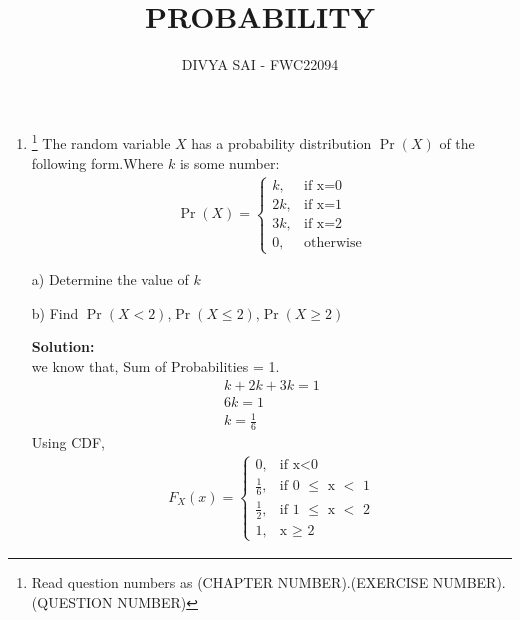 \documentclass{article}
\providecommand{\pr}[1]{\ensuremath{\Pr\left(#1\right)}}
\newcommand{\solution}{\noindent \textbf{Solution: }}
\begin{document}
\title{PROBABILITY}
\author{\Large DIVYA SAI - FWC22094}
\date{}

\maketitle
\begin{enumerate}
[label=16.\arabic{enumi}.\arabic{enumii}]%
\setcounter{enumi}{3}
\setcounter{enumii}{10}

\item \footnote{Read question numbers as (CHAPTER NUMBER).(EXERCISE NUMBER).(QUESTION NUMBER)} {The random variable $X$ has a probability distribution \pr{X} of the following form.Where $k$ is some number: }
\begin{align}
  \pr{X} =
    \begin{cases}
      k,  & \text{if x=0}\\
      2k, & \text{if x=1}\\
      3k, & \text{if x=2}\\
      0 , & \text{otherwise}
    \end{cases}       
\end{align}

a) Determine the value of $k$ 

b) Find \pr{X < 2},\pr{X \leq 2},\pr{X \geq 2}  


\solution\\
we know that,
Sum of Probabilities = 1.
\begin{align}
&k + 2k + 3k  = 1 &\\
&6k = 1 &\\
&k = \frac{1}{6}&
\end{align}
Using CDF,
\begin{align}
  F_X(x) =
    \begin{cases}
      0,  & \text{if x$<$0}\\
      \frac{1}{6}, & \text{if 0 $\leq$ x $<$ 1}\\
      \frac{1}{2}, & \text{if 1 $\leq$ x $<$ 2}\\
      1 , & \text{x $\geq$ 2}
    \end{cases}       
\end{align}


\end{enumerate}
\end{document}
